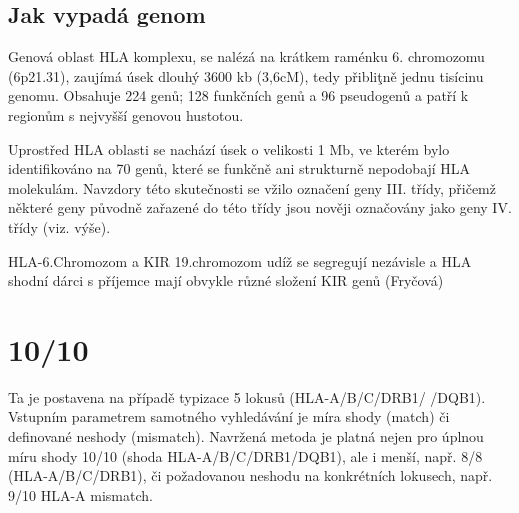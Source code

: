 \documentclass[czech,DP]{thesiskiv}
\begin{document}
\subsection{Jak vypadá genom} 
Genová oblast HLA komplexu, se nalézá na krátkem raménku 6. chromozomu (6p21.31), zaujímá úsek dlouhý 3600 kb
(3,6cM), tedy přibliţně jednu tisícinu genomu. Obsahuje 224 genů; 128 funkčních genů
a 96 pseudogenů a patří k regionům s nejvyšší genovou hustotou.

Uprostřed HLA oblasti se nachází úsek o velikosti 1 Mb, ve kterém bylo identifikováno na
70 genů, které se funkčně ani strukturně nepodobají HLA molekulám. Navzdory této
skutečnosti se vžilo označení geny III. třídy, přičemž některé geny původně zařazené do
této třídy jsou nověji označovány jako geny IV. třídy (viz. výše).

HLA-6.Chromozom a KIR 19.chromozom
udíž se segregují nezávisle a
HLA shodní dárci s příjemce mají obvykle různé složení KIR genů (Fryčová)


\section{10/10}
Ta je postavena na případě typizace 5 lokusů (HLA-A/B/C/DRB1/ /DQB1). Vstupním parametrem samotného vyhledávání je míra shody (match) či definované neshody (mismatch). Navržená metoda je platná nejen pro úplnou míru shody 10/10 (shoda HLA-A/B/C/DRB1/DQB1), ale i menší, např. 8/8 (HLA-A/B/C/DRB1), či požadovanou neshodu na konkrétních lokusech, např. 9/10 HLA-A mismatch. 
\end{document}
